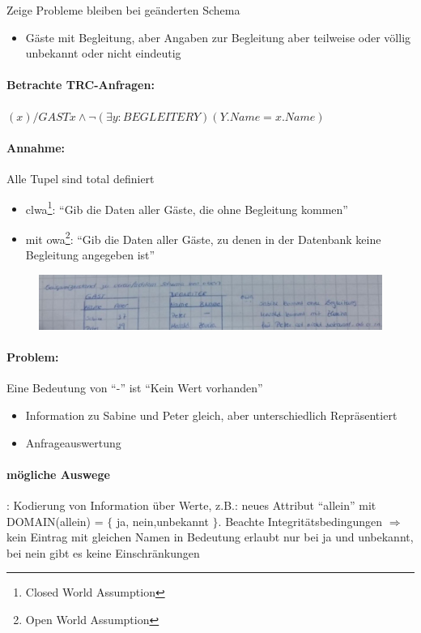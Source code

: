 \documentclass[12pt, a4paper]{article}
\begin{document}
Zeige Probleme bleiben bei geänderten Schema
\begin{itemize}
\item Gäste mit Begleitung, aber Angaben zur Begleitung aber teilweise oder völlig unbekannt oder nicht eindeutig
\end{itemize}

\paragraph{Betrachte TRC-Anfragen:} 
$(x) / GAST x \wedge \lnot (\exists y: BEGLEITER Y)(Y.Name = x.Name)$

\paragraph{Annahme:}
Alle Tupel sind total definiert
\begin{itemize}
\item clwa\footnote{Closed World Assumption}: ``Gib die Daten aller Gäste, die ohne Begleitung kommen''
\item mit owa\footnote{Open World Assumption}: ``Gib die Daten aller Gäste, zu denen in der Datenbank keine Begleitung angegeben ist''
\end{itemize}

\begin{figure}[h!]
\centering
\includegraphics[width=0.7\linewidth]{img/img29}
\caption{}
\label{fig:img29}
\end{figure}

\paragraph{Problem:}
Eine Bedeutung von ``-'' ist ``Kein Wert vorhanden''
\begin{itemize}
\item Information zu Sabine und Peter gleich, aber unterschiedlich Repräsentiert
\item Anfrageauswertung
\end{itemize}


\paragraph{mögliche Auswege}: Kodierung von Information über Werte, z.B.: neues Attribut ``allein'' mit DOMAIN(allein) = $\{ $ ja, nein,unbekannt $ \}$. Beachte Integritätsbedingungen $\Rightarrow$ kein Eintrag mit gleichen Namen in Bedeutung erlaubt nur bei ja und unbekannt, bei nein gibt es keine Einschränkungen \\ 
\end{document}
